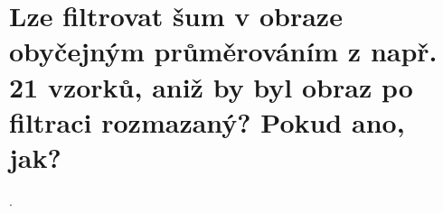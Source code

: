 \section{Lze filtrovat šum v obraze obyčejným průměrováním z např. 21 vzorků, aniž by byl obraz po filtraci rozmazaný? 
Pokud ano, jak?}.